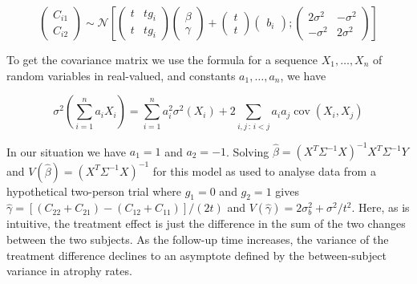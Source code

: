 \documentclass[final, paper=letter,5p,times,twocolumn]{elsarticle}
\theoremstyle{definition}
\begin{document}
{\begin{equation*}
  \left(
  \begin{array}{c}
    C_{i1} \\
    C_{i2}
  \end{array}
  \right) \sim \mathcal{N} \left[
      \left(
  \begin{array}{cc}
    t & tg_{i} \\
    t & tg_{i}
  \end{array}
  \right)\left(
  \begin{array}{c}
    \beta \\
    \gamma
  \end{array}
  \right) + \left(
  \begin{array}{c}
    t  \\
    t 
  \end{array}
  \right)\left(
  \begin{array}{c}
    b_i
  \end{array}
  \right) ;  \left(
  \begin{array}{cc}
    2\sigma^{2} & -\sigma^{2} \\
    -\sigma^{2} & 2\sigma^{2}
  \end{array}
  \right) 
    \right]
\end{equation*}

To get the covariance matrix we use the formula for a sequence $X_{1}, \ldots, X_{n}$ of random variables in real-valued, and constants $a_{1},\ldots ,a_{n}$, we have

\begin{equation*}
  \sigma ^{2}\left( \sum _{i=1}^{n}a_{i}X_{i} \right) = \sum _{i=1}^{n}a_{i}^{2}\sigma ^{2}(X_{i})+2\sum _{i,j\,:\,i<j}a_{i}a_{j}\operatorname {cov} (X_{i},X_{j})
\end{equation*}

In our situation we have $a_{1} = 1$ and $a_{2} = -1$. Solving $\hat{\beta} = (X^{T}\Sigma^{-1}X)^{-1}X^{T}\Sigma^{-1}Y$ and $V(\hat{\beta}) = (X^{T}\Sigma^{-1}X)^{-1}$ for this model as used to analyse data from a hypothetical two-person trial where $g_{1} = 0$ and $g_{2} = 1$ gives $\hat{\gamma} = [(C_{22} + C_{21}) -(C_{12} + C_{11})]/(2t)$ and $V(\hat{\gamma}) = 2\sigma_{b}^{2} + \sigma^{2}/t^{2}$. Here, as is intuitive, the treatment effect is just the difference in the sum of the two changes between the two subjects. As the follow-up time increases, the variance of the treatment difference declines to an asymptote defined by the between-subject variance in atrophy rates.}
\end{document}
